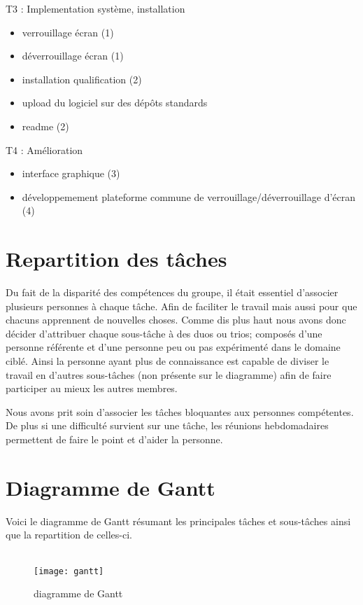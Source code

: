 T3 : Implementation système, installation
\begin{itemize}
  \item{verrouillage écran (1)}
  \item{déverrouillage écran (1)}
  \item{installation qualification (2)}
  \item{upload du logiciel sur des dépôts standards}
  \item{readme (2)}
\end{itemize}

T4 : Amélioration
\begin{itemize}
  \item{interface graphique (3)}
  \item{développemement plateforme commune de verrouillage/déverrouillage
        d’écran (4)}
\end{itemize}

\section{Repartition des tâches}

Du fait de la disparité des compétences du groupe, il était essentiel
d'associer plusieurs personnes à chaque tâche. Afin de faciliter le travail
mais aussi pour que chacuns apprennent de nouvelles choses. Comme dis plus haut
nous avons donc
décider d'attribuer chaque sous-tâche à des duos ou trios; composés d'une
personne référente et d'une personne peu ou pas expérimenté dans le domaine
ciblé. Ainsi la personne ayant plus de connaissance est capable de diviser
le travail en d'autres sous-tâches (non présente sur le diagramme) afin de faire
participer au mieux les autres membres.

Nous avons prit soin d'associer les tâches bloquantes aux personnes
compétentes. De plus si une difficulté survient sur une tâche,
les réunions hebdomadaires permettent de faire le point et d'aider la
personne.

\section{Diagramme de Gantt}
Voici le diagramme de Gantt résumant les principales tâches et sous-tâches
ainsi que la repartition de celles-ci.
\\
\\
\begin{figure}[h]
  \texttt{[image: gantt]}
  \caption{diagramme de Gantt}
\end{figure}

